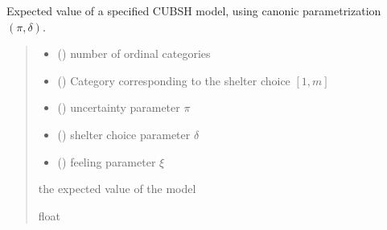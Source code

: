 \documentclass[letterpaper,10pt,english]{sphinxmanual}
\begin{document}

\begin{fulllineitems}
\label{\detokenize{cubmods:cubmods.cubsh.mean_delta}}
\pysigstartsignatures
{}
\pysigstopsignatures
\sphinxAtStartPar
Expected value of a specified CUBSH model,
using canonic parametrization \((\pi, \delta)\).
\begin{quote}\begin{description}
\begin{itemize}
\item {} 
\sphinxAtStartPar
{} () \textendash{} number of ordinal categories

\item {} 
\sphinxAtStartPar
{} () \textendash{} Category corresponding to the shelter choice \([1,m]\)

\item {} 
\sphinxAtStartPar
{} () \textendash{} uncertainty parameter \(\pi\)

\item {} 
\sphinxAtStartPar
{} () \textendash{} shelter choice parameter \(\delta\)

\item {} 
\sphinxAtStartPar
{} () \textendash{} feeling parameter \(\xi\)

\end{itemize}

\sphinxAtStartPar
the expected value of the model

\sphinxAtStartPar
float

\end{description}\end{quote}

\end{fulllineitems}
\end{document}
